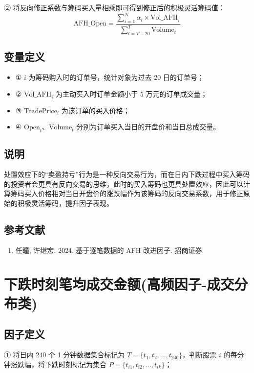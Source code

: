 \documentclass{article}
\begin{document}
② 将反向修正系数与筹码买入量相乘即可得到修正后的积极灵活筹码值：
\begin{equation}
    \mathrm{AFH\_Open} = \frac{\sum_{i=1}^{N} \alpha_i \times \mathrm{Vol\_AFH}_i}{\sum_{t=T-20}^{T} \mathrm{Volume}_t}
\end{equation}

\subsection{变量定义}
\begin{itemize}
    \item ① \( i \) 为筹码购入时的订单号，统计对象为过去 20 日的订单号；
    \item ② \( \mathrm{Vol\_AFH}_i \) 为主动买入时订单金额小于 5 万元的订单成交量；
    \item ③ \( \mathrm{TradePrice}_i \) 为该订单的买入价格；
    \item ④ \( \mathrm{Open}_t \)、\( \mathrm{Volume}_t \) 分别为订单买入当日的开盘价和当日总成交量。
\end{itemize}

\subsection{说明}
处置效应下的“卖盈持亏”行为是一种反向交易行为，而在日内下跌过程中买入筹码的投资者会更具有反向交易的思维，此时的买入筹码也更具处置效应，因此可以计算筹码买入价格相对当日开盘价的涨跌幅作为该筹码的反向交易系数，用于修正原始的积极灵活筹码，提升因子表现。

\subsection{参考文献}
\begin{enumerate}
    \item 任瞳, 许继宏. 2024. 基于逐笔数据的 AFH 改进因子. 招商证券.
\end{enumerate}

\section{下跌时刻笔均成交金额(高频因子-成交分布类)}

\subsection{因子定义}

① 将日内 240 个 1 分钟数据集合标记为 \( T = \{t_1, t_2, \dots, t_{240}\} \)，判断股票 \( i \) 的每分钟涨跌幅，将下跌时刻标记为集合 \( P = \{t_{i1}, t_{i2}, \dots, t_{ik}\} \)；
\end{document}
